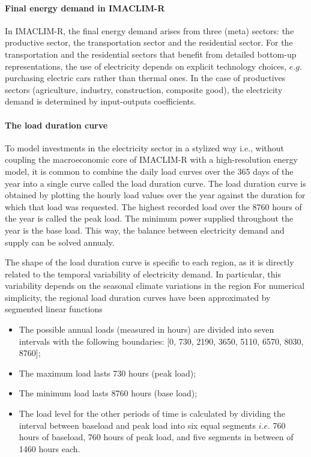  \paragraph{Final energy demand in IMACLIM-R} 
 In IMACLIM-R, the final energy demand arises from three (meta) sectors: the productive sector, the transportation sector and the residential sector. For the transportation and the residential sectors that benefit from detailed bottom-up representations, the use of electricity depends on explicit technology choices, $e.g.$ purchasing electric cars rather than thermal ones. In the case of productives sectors (agriculture, industry, construction, composite good), the electricity demand is determined by input-outputs coefficients.

 \paragraph{The load duration curve} 

To model investments in the electricity sector in a stylized way i.e., without coupling the macroeconomic core of IMACLIM-R with a high-resolution energy model, it is common to combine the daily load curves over the 365 days of the year into a single curve called the load duration curve. 
The load duration curve is obtained by plotting the hourly load values over the year against the duration for which that load was requested. The highest recorded load over the 8760 hours of the year is called the peak load. The minimum power supplied throughout the year is the base load. This way, the balance between electricity demand and supply can be solved annualy.


The shape of the load duration curve is specific to each region, as it is directly related to the temporal variability of electricity demand. In particular, this variability depends on the seasonal climate variations in the region 
For numerical simplicity, the regional load duration curves have been approximated by segmented linear functions
\begin{itemize}
    \item The possible annual loads (measured in hours) are divided into seven intervals with the following boundaries: [0, 730, 2190, 3650, 5110, 6570, 8030, 8760];
    \item The maximum load lasts 730 hours (peak load);
    \item The minimum load lasts 8760 hours (base load);
    \item The load level for the other periods of time is calculated by dividing the interval between baseload and peak load into six equal segments $i.e.$ 760 hours of baseload, 760 hours of peak load, and five segments in between of 1460 hours each.
\end{itemize} 

